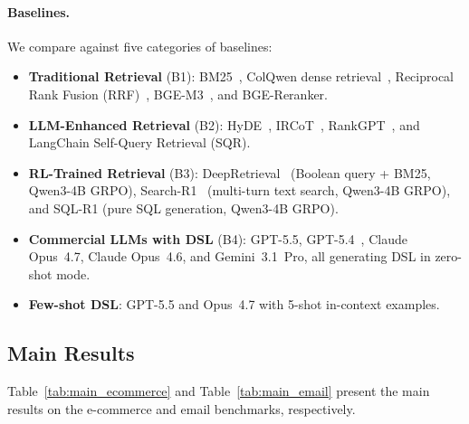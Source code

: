 \paragraph{Baselines.}
We compare against five categories of baselines:

\begin{itemize}[leftmargin=*,nosep]
\item \textbf{Traditional Retrieval} (B1): BM25~\cite{robertson2009probabilistic}, ColQwen dense retrieval~\cite{chen2024colqwen}, Reciprocal Rank Fusion (RRF)~\cite{cormack2009reciprocal}, BGE-M3~\cite{chen2024bge}, and BGE-Reranker.
\item \textbf{LLM-Enhanced Retrieval} (B2): HyDE~\cite{gao2023precise}, IRCoT~\cite{trivedi2023interleaving}, RankGPT~\cite{sun2023chatgpt}, and LangChain Self-Query Retrieval (SQR).
\item \textbf{RL-Trained Retrieval} (B3): DeepRetrieval~\cite{jiang2025deepretrieval} (Boolean query + BM25, Qwen3-4B GRPO), Search-R1~\cite{jin2025search} (multi-turn text search, Qwen3-4B GRPO), and SQL-R1 (pure SQL generation, Qwen3-4B GRPO).
\item \textbf{Commercial LLMs with DSL} (B4): GPT-5.5, GPT-5.4~\cite{openai2025gpt5}, Claude Opus~4.7, Claude Opus~4.6, and Gemini~3.1~Pro, all generating DSL in zero-shot mode.
\item \textbf{Few-shot DSL}: GPT-5.5 and Opus~4.7 with 5-shot in-context examples.
\end{itemize}


\subsection{Main Results}
\label{sec:main_results}

Table~\ref{tab:main_ecommerce} and Table~\ref{tab:main_email} present the main results on the e-commerce and email benchmarks, respectively.

